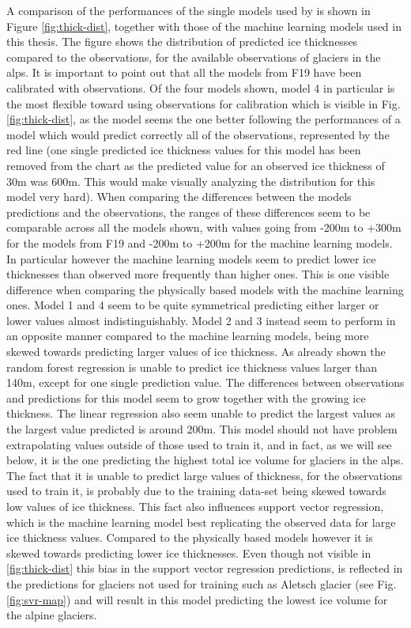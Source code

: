 A comparison of the performances of the single models used by \citet{Farinotti2019} is shown in Figure \ref{fig:thick-dist}, together with those of the machine learning models used in this thesis. The figure shows the distribution of predicted ice thicknesses compared to the observations, for the available observations of glaciers in the alps. It is important to point out that all the models from F19 have been calibrated with observations. Of the four models shown, model 4 in particular is the most flexible toward using observations for calibration which is visible in Fig. \ref{fig:thick-dist}, as the model seems the one better following the performances of a model which would predict correctly all of the observations, represented by the red line (one single predicted ice thickness values for this model has been removed from the chart as the predicted value for an observed ice thickness of 30m was 600m. This would make visually analyzing the distribution for this model very hard). When comparing the differences between the models predictions and the observations, the ranges of these differences seem to be comparable across all the models shown, with values going from -200m to +300m for the models from F19 and -200m to +200m for the machine learning models. In particular however the machine learning models seem to predict lower ice thicknesses than observed more frequently than higher ones. This is one visible difference when comparing the physically based models with the machine learning ones. Model 1 and 4 seem to be quite symmetrical predicting either larger or lower values almost indistinguishably. Model 2 and 3 instead seem to perform in an opposite manner compared to the machine learning models, being more skewed towards predicting larger values of ice thickness. As already shown the random forest regression is unable to predict ice thickness values larger than 140m, except for one single prediction value. The differences between observations and predictions for this model seem to grow together with the growing ice thickness. The linear regression also seem unable to predict the largest values as the largest value predicted is around 200m. This model should not have problem extrapolating values outside of those used to train it, and in fact, as we will see below, it is the one predicting the highest total ice volume for glaciers in the alps. The fact that it is unable to predict large values of thickness, for the observations used to train it, is probably due to the training data-set being skewed towards low values of ice thickness. This fact also influences support vector regression, which is the machine learning model best replicating the observed data for large ice thickness values. Compared to the physically based models however it is skewed towards predicting lower ice thicknesses. Even though not visible in \ref{fig:thick-dist} this bias in the support vector regression predictions, is reflected in the predictions for glaciers not used for training such as Aletsch glacier (see Fig. \ref{fig:svr-map}) and will result in this model predicting the lowest ice volume for the alpine glaciers.

